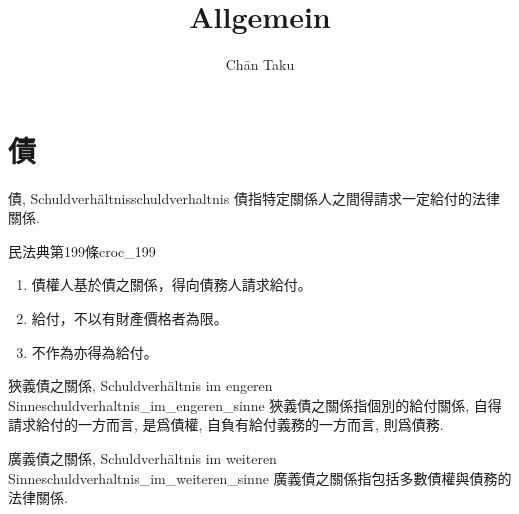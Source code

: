 \documentclass{article}
\title{Allgemein}
\author{Ch\=an Taku}
\begin{document}
\maketitle

\section{債}

\begin{definition}{債, Schuldverhältnis}{schuldverhaltnis}
    債指特定關係人之間得請求一定給付的法律關係.
\end{definition}

\begin{proposition}{民法典第199條}{croc_199}
    \begin{enumerate}
        \item 債權人基於債之關係，得向債務人請求給付。
        \item 給付，不以有財產價格者為限。
        \item 不作為亦得為給付。
    \end{enumerate}
\end{proposition}

\begin{definition}{狹義債之關係, Schuldverhältnis im engeren Sinne}{schuldverhaltnis_im_engeren_sinne}
    狹義債之關係指個別的給付關係, 自得請求給付的一方而言, 是爲債權, 自負有給付義務的一方而言, 則爲債務.
\end{definition}

\begin{definition}{廣義債之關係, Schuldverhältnis im weiteren Sinne}{schuldverhaltnis_im_weiteren_sinne}
    廣義債之關係指包括多數債權與債務的法律關係.
\end{definition}

% 
% 
\end{document}
